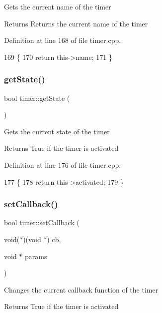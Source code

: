 Gets the current name of the timer \begin{DoxyReturn}{Returns}
Returns the current name of the timer 
\end{DoxyReturn}


Definition at line 168 of file timer.\+cpp.


\begin{DoxyCode}
169 \{
170     \textcolor{keywordflow}{return} this->name;
171 \}
\end{DoxyCode}
\mbox{\label{classtimer_a35c72b981bb55b98e979f83a988f434c}} 
\subsubsection{\texorpdfstring{get\+State()}{getState()}}
{\footnotesize\ttfamily bool timer\+::get\+State (\begin{DoxyParamCaption}{ }\end{DoxyParamCaption})}

Gets the current state of the timer \begin{DoxyReturn}{Returns}
True if the timer is activated 
\end{DoxyReturn}


Definition at line 176 of file timer.\+cpp.


\begin{DoxyCode}
177 \{
178     \textcolor{keywordflow}{return} this->activated;
179 \}
\end{DoxyCode}
\mbox{\label{classtimer_a75f1f309bb222687385ede7d2d8233c3}} 
\subsubsection{\texorpdfstring{set\+Callback()}{setCallback()}}
{\footnotesize\ttfamily bool timer\+::set\+Callback (\begin{DoxyParamCaption}\item[{void($\ast$)(void $\ast$)}]{cb,  }\item[{void $\ast$}]{params }\end{DoxyParamCaption})}

Changes the current callback function of the timer \begin{DoxyReturn}{Returns}
True if the timer is activated 
\end{DoxyReturn}


